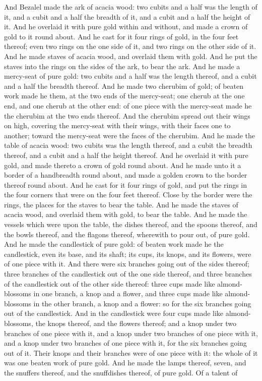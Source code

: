 And Bezalel made the ark of acacia wood: two cubits and a half was the length of it, and a cubit and a half the breadth of it, and a cubit and a half the height of it. And he overlaid it with pure gold within and without, and made a crown of gold to it round about. And he cast for it four rings of gold, in the four feet thereof; even two rings on the one side of it, and two rings on the other side of it. And he made staves of acacia wood, and overlaid them with gold. And he put the staves into the rings on the sides of the ark, to bear the ark. And he made a mercy-seat of pure gold: two cubits and a half was the length thereof, and a cubit and a half the breadth thereof. And he made two cherubim of gold; of beaten work made he them, at the two ends of the mercy-seat; one cherub at the one end, and one cherub at the other end: of one piece with the mercy-seat made he the cherubim at the two ends thereof. And the cherubim spread out their wings on high, covering the mercy-seat with their wings, with their faces one to another; toward the mercy-seat were the faces of the cherubim.  And he made the table of acacia wood: two cubits was the length thereof, and a cubit the breadth thereof, and a cubit and a half the height thereof. And he overlaid it with pure gold, and made thereto a crown of gold round about. And he made unto it a border of a handbreadth round about, and made a golden crown to the border thereof round about. And he cast for it four rings of gold, and put the rings in the four corners that were on the four feet thereof. Close by the border were the rings, the places for the staves to bear the table. And he made the staves of acacia wood, and overlaid them with gold, to bear the table. And he made the vessels which were upon the table, the dishes thereof, and the spoons thereof, and the bowls thereof, and the flagons thereof, wherewith to pour out, of pure gold.  And he made the candlestick of pure gold: of beaten work made he the candlestick, even its base, and its shaft; its cups, its knops, and its flowers, were of one piece with it. And there were six branches going out of the sides thereof; three branches of the candlestick out of the one side thereof, and three branches of the candlestick out of the other side thereof: three cups made like almond-blossoms in one branch, a knop and a flower, and three cups made like almond-blossoms in the other branch, a knop and a flower: so for the six branches going out of the candlestick. And in the candlestick were four cups made like almond-blossoms, the knops thereof, and the flowers thereof; and a knop under two branches of one piece with it, and a knop under two branches of one piece with it, and a knop under two branches of one piece with it, for the six branches going out of it. Their knops and their branches were of one piece with it: the whole of it was one beaten work of pure gold. And he made the lamps thereof, seven, and the snuffers thereof, and the snuffdishes thereof, of pure gold. Of a talent of 